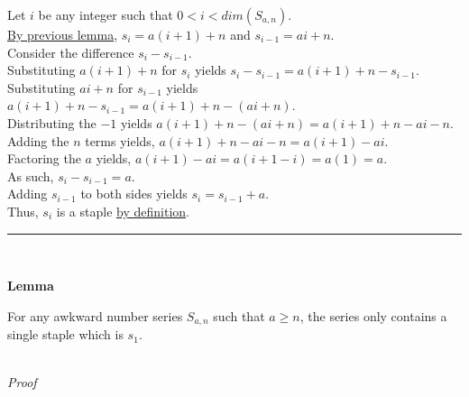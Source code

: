 \documentclass[a4paper,12pt]{article}
\begin{document}
\noindent Let $i$ be any integer such that $0 < i < dim(S_{a, n})$.\\

\noindent \hyperlink{lemma:basis_lengths}{By previous lemma}, $s_i = a(i + 1) + n$ and $s_{i - 1} = ai + n$.\\

\noindent Consider the difference $s_i - s_{i - 1}$.\\

\noindent Substituting $a(i + 1) + n$ for $s_i$ yields $s_i - s_{i - 1} = a(i + 1) + n - s_{i - 1}$.\\

\noindent Substituting $ai + n$ for $s_{i - 1}$ yields $a(i + 1) + n - s_{i - 1} = a(i + 1) + n - (ai + n)$.\\

\noindent Distributing the $-1$ yields $a(i + 1) + n - (ai + n) = a(i + 1) + n - ai - n$.\\

\noindent Adding the $n$ terms yields, $a(i + 1) + n - ai - n = a(i + 1) - ai$.\\

\noindent Factoring the $a$ yields, $a(i + 1) - ai = a(i + 1 - i) = a(1) = a$.\\

\noindent As such, $s_i - s_{i - 1} = a$.\\

\noindent Adding $s_{i - 1}$ to both sides yields $s_i = s_{i - 1} + a$.\\

\noindent Thus, $s_i$ is a staple \hyperlink{definition:staple}{by definition}.



\begin{center}
\noindent\rule{8cm}{0.4pt}
\end{center}
\noindent \\








\label{lemma:only_staple}
\hypertarget{lemma:only_staple}{}
\begin{tcolorbox}
\textbf{Lemma}

\noindent For any awkward number series $S_{a,n}$ such that $a \geq n$, the series only contains a single staple which is $s_1$.

\end{tcolorbox}

\noindent \\
\textit{Proof}
\end{document}
